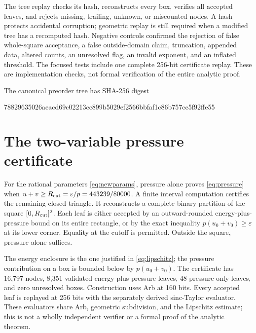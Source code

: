 \documentclass[11pt]{article}
\theoremstyle{remark}
\begin{document}
The tree replay checks its hash, reconstructs every box, verifies all
accepted leaves, and rejects missing, trailing, unknown, or miscounted
nodes. A hash protects accidental corruption; geometric replay is still
required when a modified tree has a recomputed hash. Negative controls
confirmed the rejection of false whole-square acceptance, a false
outside-domain claim, truncation, appended data, altered counts, an
unresolved flag, an invalid exponent, and an inflated threshold. The
focused tests include one complete 256-bit certificate replay. These are
implementation checks, not formal verification of the entire analytic
proof.

The canonical preorder tree has SHA-256 digest
\begin{center}\small\ttfamily
78829635026aeacd69c02213cc899b5029ef2566bbfaf1c86b757cc5f92ffe55
\end{center}

\section{The two-variable pressure certificate}\label{sec:pressurecert}

For the rational parameters \eqref{eq:newparams}, pressure alone proves
\eqref{eq:pressure} when $u+v\ge R_{\rm cut}=\varepsilon/p=443239/80000$.
A finite interval computation certifies the remaining closed triangle. It
reconstructs a complete binary partition of the square
$[0,R_{\rm cut}]^2$. Each leaf is either accepted by an outward-rounded
energy-plus-pressure bound on its entire rectangle, or by the exact
inequality $p(u_0+v_0)\ge\varepsilon$ at its lower corner. Equality at
the cutoff is permitted. Outside the square, pressure alone suffices.

The energy enclosure is the one justified in \eqref{eq:lipschitz}; the
pressure contribution on a box is bounded below by $p(u_0+v_0)$.
The certificate has 16,797 nodes, 8,351 validated energy-plus-pressure
leaves, 48 pressure-only leaves, and zero unresolved boxes. Construction
uses Arb at 160 bits. Every accepted leaf is replayed at 256 bits with the
separately derived sinc-Taylor evaluator. These evaluators share Arb,
geometric subdivision, and the Lipschitz estimate; this is not a wholly
independent verifier or a formal proof of the analytic theorem.
\end{document}
